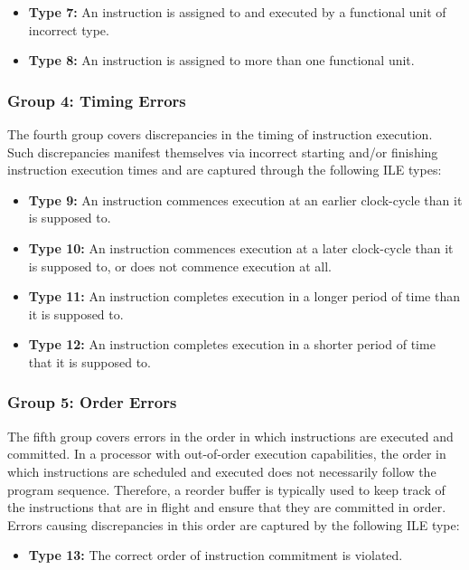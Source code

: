 \documentclass[12pt]{yalephd}
\begin{document}
\begin{itemize}
\item{\bf{Type 7:}} An instruction is assigned to and executed by a functional unit
of incorrect type.
\item{\bf{Type 8:}} An instruction is assigned to more than one
functional unit.
\end{itemize}

\subsubsection{Group 4: Timing Errors}

The fourth group covers discrepancies in the timing of instruction execution. Such discrepancies manifest themselves via incorrect starting and/or finishing instruction execution times and are captured through the following ILE types:

\begin{itemize}
\item{\bf{Type 9:}} An instruction commences execution at an earlier clock-cycle than
it is supposed to.
\item{\bf{Type 10:}} An instruction commences execution at a later
clock-cycle than it is supposed to, or does not commence execution
at all.
\item{\bf{Type 11:}} An instruction completes execution in a longer period of time
than it is supposed to.
\item{\bf{Type 12:}} An instruction completes execution in a shorter
period of time that it is supposed to.
\end{itemize}

\subsubsection{Group 5: Order Errors}

The fifth group covers errors in the order in which instructions are executed and committed. In a processor with out-of-order execution capabilities, the order in which instructions are scheduled and executed does not necessarily follow the program sequence. Therefore, a reorder buffer is typically used to keep track of the instructions that are in flight and ensure that they are committed in order. Errors causing discrepancies in this order are captured by the following ILE type:

\begin{itemize}
\item{\bf{Type 13:}} The correct order of instruction commitment is
violated.
\end{itemize}
\end{document}
